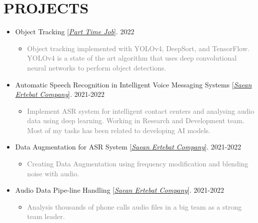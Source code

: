 \documentclass[10pt,a4paper,sans]{moderncv} %
\begin{document}
	\section{PROJECTS}
	\vspace{0.3em}
	\begin{itemize}
		
		\item Object Tracking [\href{mailto:mbahmanabadi96@gmail.com}{\emph{Part Time Job}}]. \hfill 2022
		\begin{itemize}
			\item \textcolor{gray} {Object tracking implemented with YOLOv4, DeepSort, and TensorFlow. YOLOv4 is a state of the art algorithm that uses deep convolutional neural networks to perform object detections.}
		\end{itemize}
		
		\item Automatic Speech Recognition in Intelligent Voice Messaging Systems  [\href{http://www.senatelecom.com/}{\emph{Saean Ertebat Company}}]. \hfill 2021-2022
		\begin{itemize}
			\item \textcolor{gray} {Implement ASR system for intelligent contact centers and analysing audio data using deep learning. Working in Research and Development team. Most of my tasks has been related to developing AI models.}
		\end{itemize}

		\item Data Augmentation for ASR System [\href{http://www.senatelecom.com/}{\emph{Saean Ertebat Company}}]. \hfill 2021-2022
		\begin{itemize}
			\item \textcolor{gray} {Creating Data Augmentation using frequency modification and blending noise with audio.}
		\end{itemize}

		\item Audio Data Pipe-line Handling [\href{http://www.senatelecom.com/}{\emph{Saean Ertebat Company}}]. \hfill 2021-2022
		\begin{itemize}
			\item \textcolor{gray} {Analysis thousands of phone calls audio files in a big team as a strong team leader.}
		\end{itemize}
		

\end{itemize}
\end{document}
